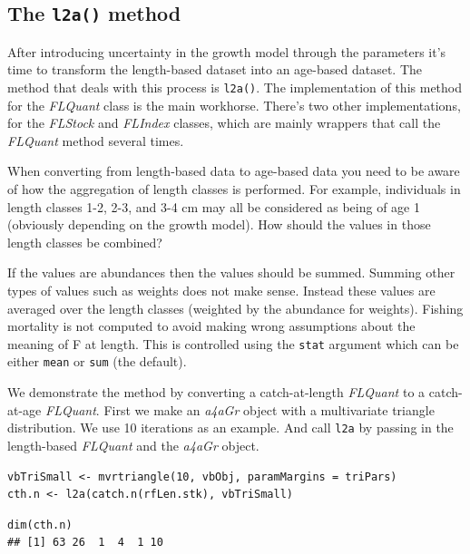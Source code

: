 \documentclass[a4paper,english,10pt]{article}\usepackage[]{graphicx}\usepackage[]{color}
\makeatletter
\newenvironment{kframe}{%
 \def\at@end@of@kframe{}%
 \ifinner\ifhmode%
  \def\at@end@of@kframe{\end{minipage}}%
  \begin{minipage}{\columnwidth}%
 \fi\fi%
 \def\FrameCommand##1{\hskip\@totalleftmargin \hskip-\fboxsep
 \colorbox{shadecolor}{##1}\hskip-\fboxsep
     \hskip-\linewidth \hskip-\@totalleftmargin \hskip\columnwidth}%
 \MakeFramed {\advance\hsize-\width
   \@totalleftmargin\z@ \linewidth\hsize
   \@setminipage}}%
 {\par\unskip\endMakeFramed%
 \at@end@of@kframe}
\newenvironment{knitrout}{}{} %
\newcommand{\code}[1]{{\texttt{#1}}}
\newcommand{\class}[1]{{\textit{#1}}}
\makeatother
\begin{document}
\subsection{The \code{l2a()} method}

After introducing uncertainty in the growth model through the parameters it's time to transform the length-based dataset into an age-based dataset. The method that deals with this process is \code{l2a()}. The implementation of this method for the \class{FLQuant} class is the main workhorse. There's two other implementations, for the \class{FLStock} and \class{FLIndex} classes, which are mainly wrappers that call the \class{FLQuant} method several times.

When converting from length-based data to age-based data you need to be aware of how the aggregation of length classes is performed. For example, individuals in length classes 1-2, 2-3, and 3-4 cm may all be considered as being of age 1 (obviously depending on the growth model). How should the values in those length classes be combined?

If the values are abundances then the values should be summed. Summing other types of values such as weights does not make sense. Instead these values are averaged over the length classes (weighted by the abundance for weights). Fishing mortality is not computed to avoid making wrong assumptions about the meaning of F at length. This is controlled using the \code{stat} argument which can be either \code{mean} or \code{sum} (the default).

We demonstrate the method by converting a catch-at-length \class{FLQuant} to a catch-at-age \class{FLQuant}. First we make an \class{a4aGr} object with a multivariate triangle distribution. We use 10 iterations as an example. And call \code{l2a} by passing in the length-based \class{FLQuant} and the \class{a4aGr} object.

\begin{knitrout}
\color{fgcolor}\begin{kframe}
\begin{verbatim}
vbTriSmall <- mvrtriangle(10, vbObj, paramMargins = triPars)
cth.n <- l2a(catch.n(rfLen.stk), vbTriSmall)
\end{verbatim}
\end{kframe}
\end{knitrout}


\begin{knitrout}
\color{fgcolor}\begin{kframe}
\begin{verbatim}
dim(cth.n)
## [1] 63 26  1  4  1 10
\end{verbatim}
\end{kframe}
\end{knitrout}
\end{document}
